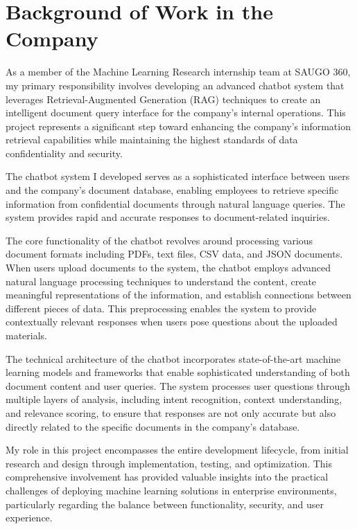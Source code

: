 \documentclass[12pt,a4paper]{article}
\begin{document}
\section{Background of Work in the Company}

As a member of the Machine Learning Research internship team at SAUGO 360, my primary responsibility involves developing an advanced chatbot system that leverages Retrieval-Augmented Generation (RAG) techniques to create an intelligent document query interface for the company's internal operations. This project represents a significant step toward enhancing the company's information retrieval capabilities while maintaining the highest standards of data confidentiality and security.

The chatbot system I developed serves as a sophisticated interface between users and the company's document database, enabling employees to retrieve specific information from confidential documents through natural language queries. The system provides rapid and accurate responses to document-related inquiries.

The core functionality of the chatbot revolves around processing various document formats including PDFs, text files, CSV data, and JSON documents. When users upload documents to the system, the chatbot employs advanced natural language processing techniques to understand the content, create meaningful representations of the information, and establish connections between different pieces of data. This preprocessing enables the system to provide contextually relevant responses when users pose questions about the uploaded materials.

The technical architecture of the chatbot incorporates state-of-the-art machine learning models and frameworks that enable sophisticated understanding of both document content and user queries. The system processes user questions through multiple layers of analysis, including intent recognition, context understanding, and relevance scoring, to ensure that responses are not only accurate but also directly related to the specific documents in the company's database.

My role in this project encompasses the entire development lifecycle, from initial research and design through implementation, testing, and optimization. This comprehensive involvement has provided valuable insights into the practical challenges of deploying machine learning solutions in enterprise environments, particularly regarding the balance between functionality, security, and user experience.
\end{document}
